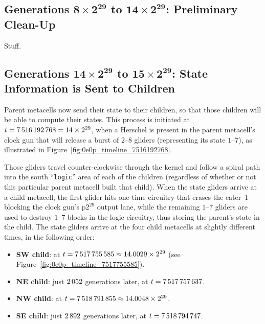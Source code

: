 \subsection{Generations $\mathbf{8 \times 2^{29}}$ to $\mathbf{14 \times 2^{29}}$: Preliminary Clean-Up}\label{sec:0e0p_timeline_prelim_cleanup}

Stuff.


\subsection{Generations $\mathbf{14 \times 2^{29}}$ to $\mathbf{15 \times 2^{29}}$: State Information is Sent to Children}\label{sec:0e0p_timeline_state}

Parent metacells now send their state to their children, so that those children will be able to compute their states. This process is initiated at $t = 7{\,}516{\,}192{\,}768 = 14 \times 2^{29}$, when a Herschel is present in the parent metacell's clock gun that will release a burst of $2$--$8$ gliders (representing its state $1$--$7$), as illustrated in Figure~\ref{fig:0e0p_timeline_7516192768}.


Those gliders travel counter-clockwise through the kernel and follow a spiral path into the south ``\texttt{logic}'' area of each of the children (regardless of whether or not this particular parent metacell built that child). When the state gliders arrive at a child metacell, the first glider hits one-time circuitry that erases the eater~1 blocking the clock gun's p$2^{29}$ output lane, while the remaining $1$--$7$ gliders are used to destroy $1$--$7$ blocks in the logic circuitry, thus storing the parent's state in the child. The state gliders arrive at the four child metacells at slightly different times, in the following order:\smallskip

\begin{itemize}
	\item \textbf{SW child}: at $t = 7{\,}517{\,}755{\,}585 \approx 14.0029 \times 2^{29}$ (see Figure~\ref{fig:0e0p_timeline_7517755585}).\smallskip
	
	\item \textbf{NE child}: just $2{\,}052$ generations later, at $t = 7{\,}517{\,}757{\,}637$.\smallskip
	
	\item \textbf{NW child}: at $t = 7{\,}518{\,}791{\,}855 \approx 14.0048 \times 2^{29}$.\smallskip
	
	\item \textbf{SE child}: just $2{\,}892$ generations later, at $t = 7{\,}518{\,}794{\,}747$.\smallskip
\end{itemize}

